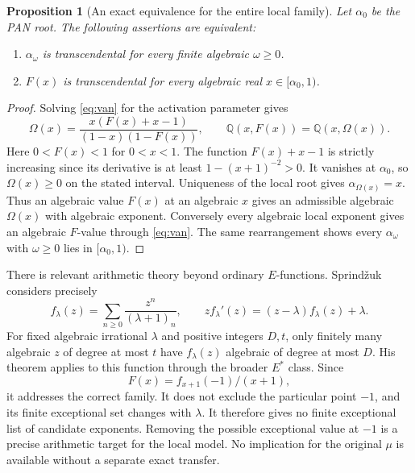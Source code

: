 \documentclass[11pt]{article}
\newtheorem{proposition}[theorem]{Proposition}
\theoremstyle{remark}
\newcommand{\Q}{\mathbb Q}
\begin{document}
\begin{proposition}[An exact equivalence for the entire local family]
Let $\alpha_0$ be the PAN root. The following assertions are equivalent:
\begin{enumerate}
\item $\alpha_\omega$ is transcendental for every finite algebraic
      $\omega\ge0$.
\item $F(x)$ is transcendental for every algebraic real
      $x\in[\alpha_0,1)$.
\end{enumerate}
\end{proposition}
\begin{proof}
Solving \eqref{eq:van} for the activation parameter gives
\[
 \Omega(x)=\frac{x(F(x)+x-1)}{(1-x)(1-F(x))},\qquad
 \Q(x,F(x))=\Q(x,\Omega(x)).
\]
Here $0<F(x)<1$ for $0<x<1$. The function $F(x)+x-1$ is strictly
increasing since its derivative is at least $1-(x+1)^{-2}>0$.
It vanishes at $\alpha_0$, so $\Omega(x)\ge0$ on the stated interval.
Uniqueness of the local root gives $\alpha_{\Omega(x)}=x$.
Thus an algebraic value $F(x)$ at an algebraic $x$ gives an admissible
algebraic $\Omega(x)$ with algebraic exponent. Conversely every
algebraic local exponent gives an algebraic $F$-value through
\eqref{eq:van}. The same rearrangement shows every $\alpha_\omega$
with $\omega\ge0$ lies in $[\alpha_0,1)$.
\end{proof}

There is relevant arithmetic theory beyond ordinary $E$-functions.
Sprind\v zuk\cite[Theorems 1 and 3]{Sprindzuk} considers precisely
\[
 f_\lambda(z)=\sum_{n\ge0}\frac{z^n}{(\lambda+1)_n},\qquad
 zf_\lambda'(z)=(z-\lambda)f_\lambda(z)+\lambda.
\]
For fixed algebraic irrational $\lambda$ and positive integers $D,t$,
only finitely many algebraic $z$ of degree at most $t$ have
$f_\lambda(z)$ algebraic of degree at most $D$. His theorem applies
to this function through the broader $E^*$ class. Since
\[
 F(x)=f_{x+1}(-1)/(x+1),
\]
it addresses the correct family. It does not exclude the particular
point $-1$, and its finite exceptional set changes with $\lambda$.
It therefore gives no finite exceptional list of candidate exponents.
Removing the possible exceptional value at $-1$ is a precise arithmetic
target for the local model. No implication for the original $\mu$ is
available without a separate exact transfer.












\end{document}
